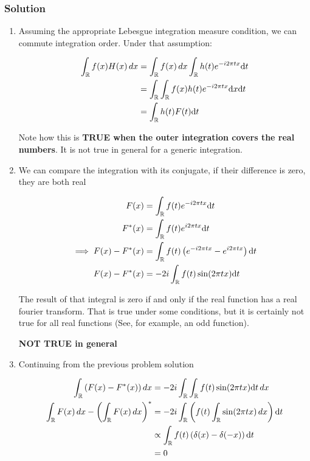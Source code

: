 \documentclass[../main/main.tex]{subfiles}
\begin{document}
\subsubsection{Solution}

\begin{enumerate}
	\item Assuming the appropriate Lebesgue integration measure condition, we can commute integration order. Under that assumption:

	      \begin{align*}
		      \int_{\R} f(x)H(x)\dx
		       & =  \int_{\R} f(x) \dx \fourierfull{h(t) e^{-i 2 \pi  t x}}[\dd t] \\
		       & =  \int_{\R}\int_{\R} f(x) h(t) e^{-i 2 \pi  t x} \dd x \dd t     \\
		       & =  \int_{\R} h(t) F(t) \dd t
	      \end{align*}

	      Note how this is \textbf{TRUE when the outer integration covers the real numbers}. It is not true in general for a generic integration.



	\item We can compare the integration with its conjugate, if their difference is zero,  they are both real

	      \begin{align*}
		      F(x)                    & =\fourierfull{f(t) e^{-i 2 \pi  t x}}[\dd t]                               \\
		      F^{*}(x)                & =\fourierfull{f(t) e^{i 2 \pi  t x}}[\dd t]                                \\
		      \implies F(x)- F^{*}(x) & = \fourierfull{f(t)\left(e^{-i 2 \pi  t x}-e^{i 2 \pi  t x}\right)}[\dd t] \\
		      F(x)- F^{*}(x)          & = -2i\fourierfull{ f(t)\sin(2\pi tx)}[\dd t]
	      \end{align*}

	      The result of that integral is zero if and only if the real function has a real fourier transform. That is true under some conditions, but it is certainly not true for all real functions (See, for example, an odd function).

	      \textbf{NOT TRUE in general}

	\item Continuing from the previous problem solution

	      \begin{align*}
		      \fourierfull{(F(x)- F^{*}(x))}
		       & = -2i\fourierfull{\fourierfull{ f(t)\sin(2\pi tx)}[\dd t]}             \\
		      \fourierfull{F(x)}- \left(\fourierfull{F(x)}\right)^{*}
		       & = -2i\fourierfull{\left(f(t)\fourierfull{\sin(2\pi tx)}\right)}[\dd t] \\
		       & \propto \fourierfull{f(t)\left(\delta(x) - \delta(-x)\right)}[\dd t]   \\
		       & = 0
	      \end{align*}


\end{enumerate}
\end{document}
